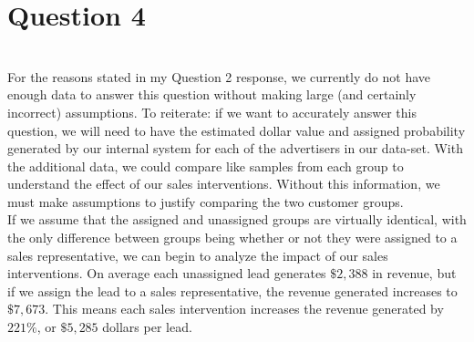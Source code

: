 \documentclass[11pt]{article}
\begin{document}
\section{Question 4}\\
For the reasons stated in my Question 2 response, we currently do not have enough data to answer this question without making large (and certainly incorrect) assumptions. To reiterate: if we want to accurately answer this question, we will need to have the estimated dollar value and assigned probability generated by our internal system for each of the advertisers in our data-set. With the additional data, we could compare like samples from each group to understand the effect of our sales interventions. Without this information, we must make assumptions to justify comparing the two customer groups. \\

If we assume that the assigned and unassigned groups are virtually identical, with the only difference between groups being whether or not they were assigned to a sales representative, we can begin to analyze the impact of our sales interventions. On average each unassigned lead generates $\$2,388$ in revenue, but if we assign the lead to a sales representative, the revenue generated increases to $\$7,673$. This means each sales intervention increases the revenue generated by $221\%$, or $\$5,285$ dollars per lead.

\begin{center}
\begin{table}[h]
    \centering
    \caption{Average Revenue by Sample, Revenue-Generating Customers Only}
\end{table}
\end{center}
\end{document}
